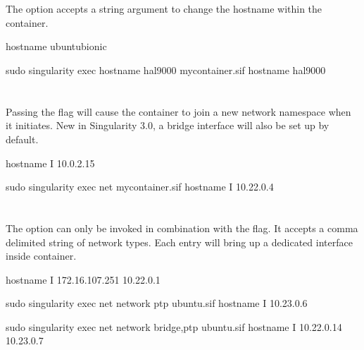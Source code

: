 \documentclass[letterpaper,10pt,english]{sphinxmanual}
\begin{document}
\section{}
\label{\detokenize{networking:hostname}}
The  option accepts a string argument to change the hostname
within the container.

%
\begin{sphinxVerbatim}[commandchars=\\\{\}]
\PYGZdl{} hostname
ubuntu\PYGZhy{}bionic

\PYGZdl{} sudo singularity exec \PYGZhy{}\PYGZhy{}hostname hal\PYGZhy{}9000 my\PYGZus{}container.sif hostname
hal\PYGZhy{}9000
\end{sphinxVerbatim}


\section{}
\label{\detokenize{networking:net}}
Passing the  flag will cause the container to join a new network
namespace when it initiates.  New in Singularity 3.0, a bridge interface will
also be set up by default.

%
\begin{sphinxVerbatim}[commandchars=\\\{\}]
\PYGZdl{} hostname \PYGZhy{}I
10.0.2.15

\PYGZdl{} sudo singularity exec \PYGZhy{}\PYGZhy{}net my\PYGZus{}container.sif hostname \PYGZhy{}I
10.22.0.4
\end{sphinxVerbatim}


\section{}
\label{\detokenize{networking:network}}
The  option can only be invoked in combination with the 
flag.  It accepts a comma delimited string of network types. Each entry will
bring up a dedicated interface inside container.

%
\begin{sphinxVerbatim}[commandchars=\\\{\}]
\PYGZdl{} hostname \PYGZhy{}I
172.16.107.251 10.22.0.1

\PYGZdl{} sudo singularity exec \PYGZhy{}\PYGZhy{}net \PYGZhy{}\PYGZhy{}network ptp ubuntu.sif hostname \PYGZhy{}I
10.23.0.6

\PYGZdl{} sudo singularity exec \PYGZhy{}\PYGZhy{}net \PYGZhy{}\PYGZhy{}network bridge,ptp ubuntu.sif hostname \PYGZhy{}I
10.22.0.14 10.23.0.7
\end{sphinxVerbatim}
\end{document}
